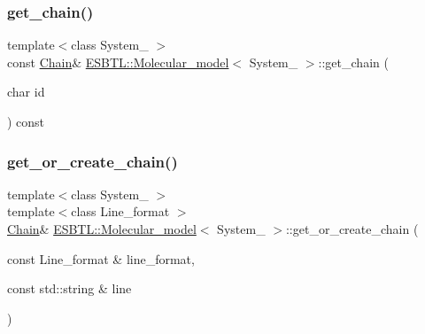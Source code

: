 \subsubsection{\texorpdfstring{get\+\_\+chain()}{get\_chain()}}
{\footnotesize\ttfamily template$<$class System\+\_\+ $>$ \\
const \hyperlink{classESBTL_1_1Molecular__model_a1d055eb841e64e198a1987e120fc985d}{Chain}\& \hyperlink{classESBTL_1_1Molecular__model}{E\+S\+B\+T\+L\+::\+Molecular\+\_\+model}$<$ System\+\_\+ $>$\+::get\+\_\+chain (\begin{DoxyParamCaption}\item[{char}]{id }\end{DoxyParamCaption}) const\hspace{0.3cm}{\ttfamily [inline]}}

\mbox{\label{classESBTL_1_1Molecular__model_af9f05f174539b4a7e4f284f21c2a310e}} 
\subsubsection{\texorpdfstring{get\+\_\+or\+\_\+create\+\_\+chain()}{get\_or\_create\_chain()}\hspace{0.1cm}{\footnotesize\ttfamily [1/2]}}
{\footnotesize\ttfamily template$<$class System\+\_\+ $>$ \\
template$<$class Line\+\_\+format $>$ \\
\hyperlink{classESBTL_1_1Molecular__model_a1d055eb841e64e198a1987e120fc985d}{Chain}\& \hyperlink{classESBTL_1_1Molecular__model}{E\+S\+B\+T\+L\+::\+Molecular\+\_\+model}$<$ System\+\_\+ $>$\+::get\+\_\+or\+\_\+create\+\_\+chain (\begin{DoxyParamCaption}\item[{const Line\+\_\+format \&}]{line\+\_\+format,  }\item[{const std\+::string \&}]{line }\end{DoxyParamCaption})\hspace{0.3cm}{\ttfamily [inline]}}

\mbox{\label{classESBTL_1_1Molecular__model_a14cabf8c1154440349fcc2160a258827}} 
